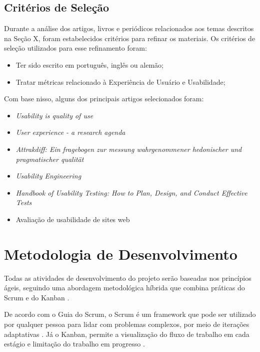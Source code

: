 \subsection{Critérios de Seleção}
\label{sec:Critérios de Selecao}
Durante a análise dos artigos, livros e periódicos relacionados aos temas descritos na Seção X, foram estabelecidos critérios para refinar os materiais. Os critérios de seleção utilizados para esse refinamento foram:

\begin{itemize}
	\item Ter sido escrito em português, inglês ou alemão;
	\item Tratar métricas relacionado à Experiência de Usuário e Usabilidade;
\end{itemize}

Com base nisso, alguns dos principais artigos selecionados foram:

\begin{itemize}
	\item \textit{Usability is quality of use} \cite{bevan1995}
	\item \textit{User experience - a research agenda} \cite{hassenzahl2006}
	\item \textit{Attrakdiff: Ein fragebogen zur messung wahrgenommener hedonischer und pragmatischer qualität} \cite{hassenzahl2003}
	\item \textit{Usability Engineering} \cite{nielsen1994usability}
	\item \textit{Handbook of Usability Testing: How to Plan, Design, and Conduct Effective Tests} \cite{rubin2011}
	\item Avaliação de usabilidade de sites web \cite{winckler2022}
\end{itemize}

\section{Metodologia de Desenvolvimento}
\label{sec:Metodologia de Desenvolvimento}
Todas as atividades de desenvolvimento do projeto serão baseadas nos princípios ágeis, seguindo uma abordagem metodológica híbrida que combina práticas do Scrum e do Kanban \cite{totvs2021} \cite{scrumguide2020}. 

De acordo com o Guia do Scrum, o Scrum é um framework que pode ser utilizado por qualquer pessoa para lidar com problemas complexos, por meio de iterações adaptativas \cite{scrumguide2020}. Já o Kanban, permite 
a visualização do fluxo de trabalho em cada estágio e limitação do trabalho em progresso \cite{anderson2011}.

